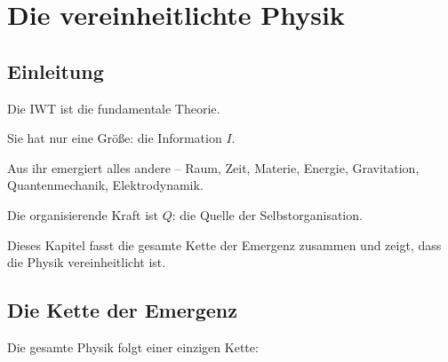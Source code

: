 \chapter{Die vereinheitlichte Physik}

\section{Einleitung}

Die IWT ist die fundamentale Theorie.

Sie hat nur eine Größe: die Information \( I \).

Aus ihr emergiert alles andere – Raum, Zeit, Materie, Energie, Gravitation, Quantenmechanik, Elektrodynamik.

Die organisierende Kraft ist \( Q \): die Quelle der Selbstorganisation.

Dieses Kapitel fasst die gesamte Kette der Emergenz zusammen und zeigt, dass die Physik vereinheitlicht ist.

\section{Die Kette der Emergenz}

Die gesamte Physik folgt einer einzigen Kette:

